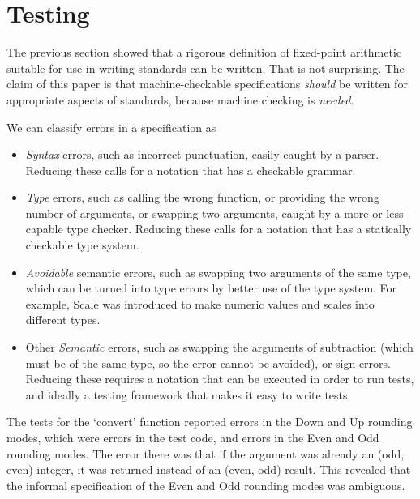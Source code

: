 \documentclass{article}
\begin{document}
\section{Testing}

The previous section showed that a rigorous definition
of fixed-point arithmetic suitable for use in writing
standards can be written.  That is not surprising.  The
claim of this paper is that machine-checkable specifications
{\it should} be written for appropriate aspects of standards,
because machine checking is {\it needed}.

We can classify errors in a specification as
\begin{itemize}
\item {\it Syntax} errors, such as incorrect punctuation,
easily caught by a parser.  Reducing these calls for a
notation that has a checkable grammar.
\item {\it Type} errors, such as calling the wrong function,
or providing the wrong number of arguments, or swapping two
arguments, caught by a more or less capable type checker.
Reducing these calls for a notation that has a statically
checkable type system.
\item {\it Avoidable} semantic errors, such as swapping
two arguments of the same type, which can be turned into
type errors by better use of the type system.  For
example, Scale was introduced to make numeric values and
scales into different types.
\item Other {\it Semantic} errors, such as swapping the
arguments of subtraction (which must be of the same type,
so the error cannot be avoided), or sign errors.
Reducing these requires a notation that can be executed
in order to run tests, and ideally a testing framework
that makes it easy to write tests.
\end{itemize}

The tests for the `convert' function reported errors in
the Down and Up rounding modes, which were errors in the
test code, and errors in the Even and Odd rounding modes.
The error there was that if the argument was already an
(odd, even) integer, it was returned instead of an
(even, odd) result.  This revealed that the informal
specification of the Even and Odd rounding modes was
ambiguous.
\end{document}
